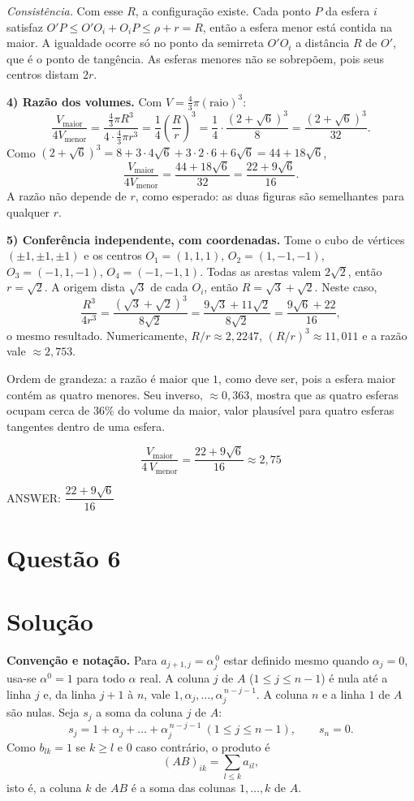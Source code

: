 \documentclass{article}%
\begin{document}
\emph{Consistência.} Com esse $R$, a configuração existe. Cada ponto $P$ da esfera $i$ satisfaz $O'P\le O'O_i+O_iP\le\rho+r=R$, então a esfera menor está contida na maior. A igualdade ocorre só no ponto da semirreta $O'O_i$ a distância $R$ de $O'$, que é o ponto de tangência. As esferas menores não se sobrepõem, pois seus centros distam $2r$.

\textbf{4) Razão dos volumes.} Com $V=\frac43\pi(\text{raio})^3$:
\[
\frac{V_{\text{maior}}}{4V_{\text{menor}}}=\frac{\frac43\pi R^3}{4\cdot\frac43\pi r^3}=\frac14\left(\frac{R}{r}\right)^3=\frac14\cdot\frac{(2+\sqrt6)^3}{8}=\frac{(2+\sqrt6)^3}{32}.
\]
Como $(2+\sqrt6)^3=8+3\cdot4\sqrt6+3\cdot2\cdot6+6\sqrt6=44+18\sqrt6$,
\[
\frac{V_{\text{maior}}}{4V_{\text{menor}}}=\frac{44+18\sqrt6}{32}=\frac{22+9\sqrt6}{16}.
\]
A razão não depende de $r$, como esperado: as duas figuras são semelhantes para qualquer $r$.

\textbf{5) Conferência independente, com coordenadas.} Tome o cubo de vértices $(\pm1,\pm1,\pm1)$ e os centros $O_1=(1,1,1)$, $O_2=(1,-1,-1)$, $O_3=(-1,1,-1)$, $O_4=(-1,-1,1)$. Todas as arestas valem $2\sqrt2$, então $r=\sqrt2$. A origem dista $\sqrt3$ de cada $O_i$, então $R=\sqrt3+\sqrt2$. Neste caso,
\[
\frac{R^3}{4r^3}=\frac{(\sqrt3+\sqrt2)^3}{8\sqrt2}=\frac{9\sqrt3+11\sqrt2}{8\sqrt2}=\frac{9\sqrt6+22}{16},
\]
o mesmo resultado. Numericamente, $R/r\approx2{,}2247$, $(R/r)^3\approx11{,}011$ e a razão vale $\approx2{,}753$.

Ordem de grandeza: a razão é maior que $1$, como deve ser, pois a esfera maior contém as quatro menores. Seu inverso, $\approx0{,}363$, mostra que as quatro esferas ocupam cerca de $36\%$ do volume da maior, valor plausível para quatro esferas tangentes dentro de uma esfera.

\[
\boxed{\dfrac{V_{\text{maior}}}{4\,V_{\text{menor}}}=\dfrac{22+9\sqrt6}{16}\approx 2{,}75}
\]

ANSWER: $\dfrac{22+9\sqrt{6}}{16}$%
\newpage%
\section*{Questão 6}

\section*{Solução}

\textbf{Convenção e notação.} Para $a_{j+1,j}=\alpha_j^{\,0}$ estar definido mesmo quando $\alpha_j=0$, usa-se $\alpha^0=1$ para todo $\alpha$ real. A coluna $j$ de $A$ ($1\le j\le n-1$) é nula até a linha $j$ e, da linha $j+1$ à $n$, vale $1,\alpha_j,\dots,\alpha_j^{\,n-j-1}$. A coluna $n$ e a linha $1$ de $A$ são nulas. Seja $s_j$ a soma da coluna $j$ de $A$:
\[
s_j=1+\alpha_j+\dots+\alpha_j^{\,n-j-1}\ (1\le j\le n-1),\qquad s_n=0 .
\]
Como $b_{lk}=1$ se $k\ge l$ e $0$ caso contrário, o produto é
\[
(AB)_{ik}=\sum_{l\le k}a_{il},
\]
isto é, a coluna $k$ de $AB$ é a soma das colunas $1,\dots,k$ de $A$.
\end{document}
